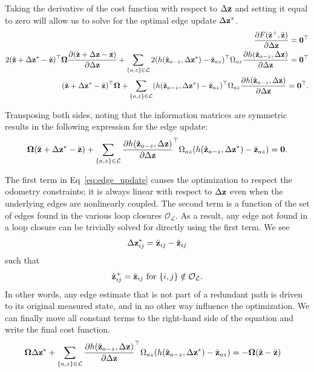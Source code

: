 Taking the derivative of the cost function with respect to $\Delta\mathbf{z}$ and setting it equal to zero will allow us to solve for the optimal edge update $\Delta\mathbf{z}^*$.
\begin{align*}
  \dfrac{\partial F(\hat{\mathbf{z}}^+,\bar{\mathbf{z}})}{\partial \Delta\mathbf{z}} = \mathbf{0}^\top \\
  2 (\hat{\mathbf{z}}+\Delta\mathbf{z}^*-\bar{\mathbf{z}})^\top \boldsymbol{\Omega} \frac{\partial (\hat{\mathbf{z}}+\Delta\mathbf{z}-\bar{\mathbf{z}})}{\partial \Delta\mathbf{z}}
    + \sum_{\{a,z\} \in \mathcal{L}} 2
  (h(\hat{\mathbf{z}}_{a-z},\Delta\mathbf{z}^*)-\bar{\mathbf{z}}_{az})^\top \Omega_{az}
  \frac{\partial h(\hat{\mathbf{z}}_{a-z},\Delta\mathbf{z})}{\partial \Delta\mathbf{z}}
  = \mathbf{0}^\top
  \\
  (\hat{\mathbf{z}}+\Delta\mathbf{z}^*-\bar{\mathbf{z}})^\top \boldsymbol{\Omega}
  + \sum_{\{a,z\} \in \mathcal{L}}
  (h(\hat{\mathbf{z}}_{a-z},\Delta\mathbf{z}^*)-\bar{\mathbf{z}}_{az})^\top \Omega_{az}
  \frac{\partial h(\hat{\mathbf{z}}_{a-z},\Delta\mathbf{z})}{\partial \Delta\mathbf{z}}
  = \mathbf{0}^\top.
\end{align*}

Transposing both sides, noting that the information matrices are symmetric results in the following expression for the edge update:
\begin{align}
  \boldsymbol{\Omega} (\hat{\mathbf{z}}+\Delta\mathbf{z}^*-\bar{\mathbf{z}})
  + \sum_{\{a,z\} \in \mathcal{L}}
  \frac{\partial h(\hat{\mathbf{z}}_{a-z},\Delta\mathbf{z})}{\partial \Delta\mathbf{z}}^\top \Omega_{az} (h(\hat{\mathbf{z}}_{a-z},\Delta\mathbf{z}^*)-\bar{\mathbf{z}}_{az})
  = \mathbf{0}.
  \label{eq:edge_update}
\end{align}

The first term in Eq~\ref{eq:edge_update} causes the optimization to respect the odometry constraints; it is always linear with respect to $\Delta\mathbf{z}$ even when the underlying edges are nonlinearly coupled. The second term is a function of the set of edges found in the various loop closures $\mathcal{O_L}$. As a result, any edge not found in a loop closure can be trivially solved for directly using the first term. We see
\begin{align*}
  \Delta\mathbf{z}_{ij}^* = \bar{\mathbf{z}}_{ij} -\hat{\mathbf{z}}_{ij}
  \end{align*}
  such that
  \begin{align*}
  \hat{\mathbf{z}}_{ij}^+ = \bar{\mathbf{z}}_{ij}  \text{ for } \{i,j\} \notin \mathcal{O_L}.
\end{align*}
In other words, any edge estimate that is not part of a redundant path is driven to its original measured state, and in no other way influence the optimization. We can finally move all constant terms to the right-hand side of the equation and write the final cost function.
\begin{align}
  \boldsymbol{\Omega} \Delta\mathbf{z}^*  + \sum_{\{a,z\} \in \mathcal{L}}
  \frac{\partial h(\hat{\mathbf{z}}_{a-z},\Delta\mathbf{z})}{\partial \Delta\mathbf{z}}^\top
  \Omega_{az}(h(\hat{\mathbf{z}}_{a-z},\Delta\mathbf{z}^*)-\bar{\mathbf{z}}_{az})
  &= -\boldsymbol{\Omega}(\hat{\mathbf{z}} -\bar{\mathbf{z}})
  \label{eqn:opt}
\end{align}

